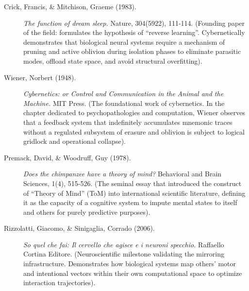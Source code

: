 \documentclass[11pt,a4paper,oneside]{article} %
\begin{document}
\begin{description}
\item[Crick, Francis, \& Mitchison, Graeme (1983).] \emph{The function of dream sleep.} Nature, 304(5922), 111-114. (Founding paper of the field: formulates the hypothesis of ``reverse learning''. Cybernetically demonstrates that biological neural systems require a mechanism of pruning and active oblivion during isolation phases to eliminate parasitic modes, offload state space, and avoid structural overfitting).

\item[Wiener, Norbert (1948).] \emph{Cybernetics: or Control and Communication in the Animal and the Machine.} MIT Press. (The foundational work of cybernetics. In the chapter dedicated to psychopathologies and computation, Wiener observes that a feedback system that indefinitely accumulates mnemonic traces without a regulated subsystem of erasure and oblivion is subject to logical gridlock and operational collapse).
\end{description}

\hypertarget{a1.7-cognitive-mirroring-and-theory-of-mind}{%
\label{a1.7-cognitive-mirroring-and-theory-of-mind}}

\begin{description}
\item[Premack, David, \& Woodruff, Guy (1978).] \emph{Does the chimpanzee have a theory of mind?} Behavioral and Brain Sciences, 1(4), 515-526. (The seminal essay that introduced the construct of ``Theory of Mind'' (ToM) into international scientific literature, defining it as the capacity of a cognitive system to impute mental states to itself and others for purely predictive purposes).

\item[Rizzolatti, Giacomo, \& Sinigaglia, Corrado (2006).] \emph{So quel che fai: Il cervello che agisce e i neuroni specchio.} Raffaello Cortina Editore. (Neuroscientific milestone validating the mirroring infrastructure. Demonstrates how biological systems map others' motor and intentional vectors within their own computational space to optimize interaction trajectories).
\end{description}

\hypertarget{a1.8-the-exosomatic-level-and-cultural-infrastructure-as-external-memory}{%
\label{a1.8-the-exosomatic-level-and-cultural-infrastructure-as-external-memory}}
\end{document}
